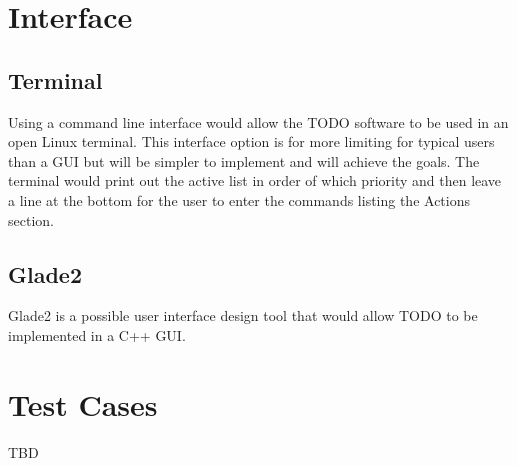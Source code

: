 \documentclass[12pt]{article}
\begin{document}
\section{Interface}
\subsection{Terminal}
Using a command line interface would allow the TODO software to be used in an open Linux terminal. This interface option is for more limiting for typical users than a GUI but will be simpler to implement and will achieve the goals. The terminal would print out the active list in order of which priority and then leave a line at the bottom for the user to enter the commands listing the Actions section.

\subsection{Glade2}
Glade2 is a possible user interface design tool that would allow TODO to be implemented in a C++ GUI.  


\section{Test Cases}
TBD


\end{document}
